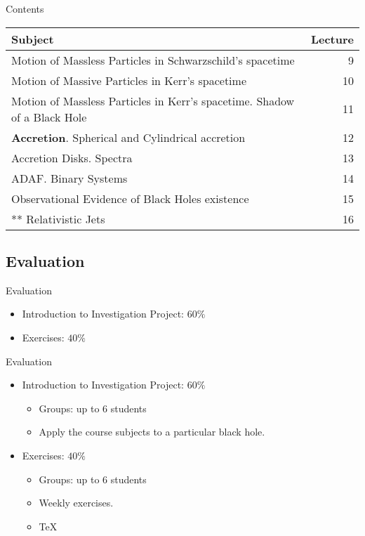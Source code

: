 \documentclass{beamer}
\begin{document}
    \begin{frame}{Contents}  
    	\begin{table}[!b]
        {\carlitoTLF %
        \begin{tabularx}{\textwidth}{Xr}
          \textbf{Subject} & \textbf{Lecture} \\
          \toprule
          Motion of Massless Particles in Schwarzschild's spacetime	& 9  \\    
          Motion of Massive Particles in Kerr's spacetime	& 10  \\    
          Motion of Massless Particles in Kerr's spacetime. Shadow of a Black Hole	& 11  \\    
          \textbf{Accretion}. Spherical and Cylindrical accretion	& 12  \\ 
          Accretion Disks. Spectra	& 13   \\    
          ADAF. Binary Systems	& 14  \\    
          Observational Evidence of Black Holes existence	& 15   \\    
          ** Relativistic Jets	& 16  \\    
          \bottomrule
        \end{tabularx}}
        
    	\end{table}
	\end{frame}

    \subsection{Evaluation}  
    \begin{frame}{Evaluation}
    	\begin{itemize}
        	\item Introduction to Investigation Project: $60\% $
            \item Exercises: $40\% $
       	\end{itemize}         
      \bigskip
    \end{frame}

	\begin{frame}{Evaluation}
    	\begin{itemize}
        	\item Introduction to Investigation Project: $60\% $
            \begin{itemize}
            	\item Groups: up to 6 students
                \item Apply the course subjects to a particular black hole.  
            \end{itemize}
            \item Exercises: $40\% $
            \begin{itemize}
            	\item Groups: up to 6 students
                \item Weekly exercises.
                \item \TeX
            \end{itemize}
       	\end{itemize}         
      \bigskip
    \end{frame}
    
\end{document}
